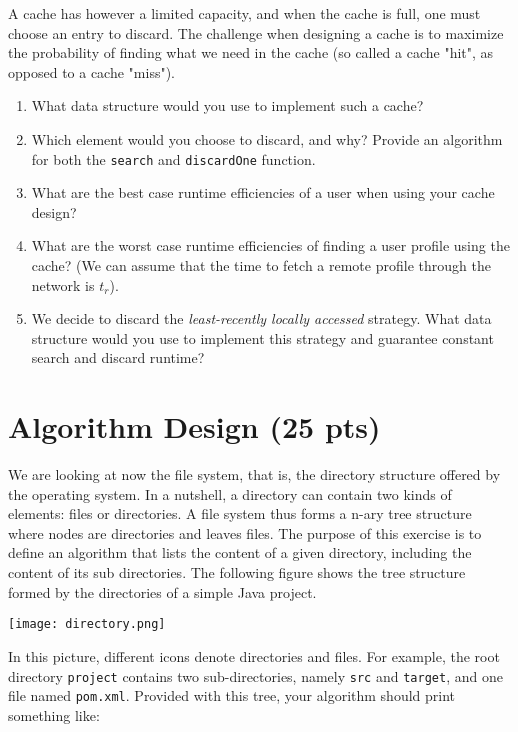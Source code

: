 \documentclass[11pt]{article}
\begin{document}
A cache has however a limited capacity, and when the cache is full,
one must choose an entry to discard. The challenge when designing
a cache is to maximize the probability of finding what we need in
the cache (so called a cache "hit", as opposed to a cache "miss").

\begin{enumerate}
\item What data structure would you use to implement such a cache?

\item Which element would you choose to discard, and why? Provide an
algorithm for both the \texttt{search} and \texttt{discardOne} function.

\item What are the best case runtime efficiencies of a user when
using your cache design?

\item What are the worst case runtime efficiencies of finding a user
profile using the cache? (We can assume that the time to fetch a
remote profile through the network is \(t_r\)).

\item We decide to discard the \emph{least-recently locally accessed}
strategy. What data structure would you use to implement this
strategy and guarantee constant search and discard runtime?
\end{enumerate}


\section{Algorithm Design (25 pts)}
\label{sec:orge81f5b2}

We are looking at now the file system, that is, the directory
structure offered by the operating system. In a nutshell, a
directory can contain two kinds of elements: files or directories. A
file system thus forms a n-ary tree structure where nodes are
directories and leaves files. The purpose of this exercise is to
define an algorithm that lists the content of a given directory,
including the content of its sub directories. The following figure
shows the tree structure formed by the directories of a simple Java
project.

\begin{center}
\texttt{[image: directory.png]}
\end{center}



In this picture, different icons denote directories and files. For
example, the root directory \texttt{project} contains two sub-directories,
namely \texttt{src} and \texttt{target}, and one file named \texttt{pom.xml}. Provided
with this tree, your algorithm should print something like:
\end{document}
